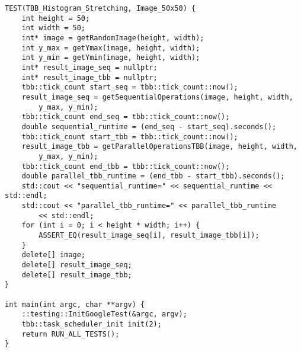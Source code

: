 \documentclass{report}
\begin{document}
\begin{lstlisting}
TEST(TBB_Histogram_Stretching, Image_50x50) {
    int height = 50;
    int width = 50;
    int* image = getRandomImage(height, width);
    int y_max = getYmax(image, height, width);
    int y_min = getYmin(image, height, width);
    int* result_image_seq = nullptr;
    int* result_image_tbb = nullptr;
    tbb::tick_count start_seq = tbb::tick_count::now();
    result_image_seq = getSequentialOperations(image, height, width,
        y_max, y_min);
    tbb::tick_count end_seq = tbb::tick_count::now();
    double sequential_runtime = (end_seq - start_seq).seconds();
    tbb::tick_count start_tbb = tbb::tick_count::now();
    result_image_tbb = getParallelOperationsTBB(image, height, width,
        y_max, y_min);
    tbb::tick_count end_tbb = tbb::tick_count::now();
    double parallel_tbb_runtime = (end_tbb - start_tbb).seconds();
    std::cout << "sequential_runtime=" << sequential_runtime << std::endl;
    std::cout << "parallel_tbb_runtime=" << parallel_tbb_runtime
        << std::endl;
    for (int i = 0; i < height * width; i++) {
        ASSERT_EQ(result_image_seq[i], result_image_tbb[i]);
    }
    delete[] image;
    delete[] result_image_seq;
    delete[] result_image_tbb;
}

int main(int argc, char **argv) {
    ::testing::InitGoogleTest(&argc, argv);
    tbb::task_scheduler_init init(2);
    return RUN_ALL_TESTS();
}

\end{lstlisting}
\end{document}
